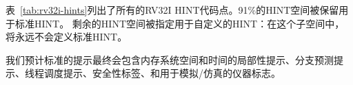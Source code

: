 表~\ref{tab:rv32i-hints}列出了所有的RV32I HINT代码点。91\%的HINT空间被保留用于标准HINT。
剩余的HINT空间被指定用于自定义的HINT：在这个子空间中，将永远不会定义标准HINT。

\begin{commentary}
我们预计标准的提示最终会包含内存系统空间和时间的局部性提示、分支预测提示、线程调度提示、安全性标签、和用于模拟/仿真的仪器标志。
\end{commentary}

